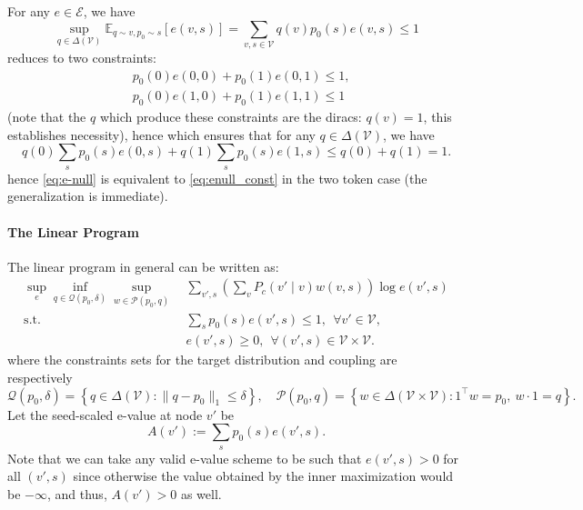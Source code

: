 \documentclass[12pt]{article}
\theoremstyle{plain}
\theoremstyle{definition}
\begin{document}
For any $e \in \mathcal{E}$, we have 
\[ \sup_{q \in \Delta(\mathcal{V})} \mathbb{E}_{q \sim v, p_0 \sim s} [e(v,s)] = \sum_{v,s \in \mathcal{V}}q(v)p_0(s)e(v,s) \le 1\]
reduces to two constraints:
\begin{align}\label{eq:enull_const}
    &p_0(0)e(0,0) + p_0(1)e(0,1) \le 1, \\
    &p_0(0)e(1,0) + p_0(1)e(1,1) \le 1 \nonumber 
\end{align}
(note that the $q$ which produce these constraints are the diracs: $q(v) = 1$, this establishes necessity), hence 
which ensures that for any $q \in \Delta(\mathcal{V})$, we have 
\[ q(0)\sum_{s}p_0(s)e(0,s) + q(1)\sum_{s}p_0(s)e(1,s) \le q(0) + q(1) =1.\]
hence \eqref{eq:e-null} is equivalent to \eqref{eq:enull_const} in the two token case (the generalization is immediate).


\paragraph{The Linear Program}
The linear program in general can be written as:
\begin{align}\label{eq:lp}
    \sup_{e}\inf_{q \in \mathcal{Q}(p_0,\delta)}\sup_{w \in \mathcal{P}(p_0,q)} &~\sum_{v',s}\left(\sum_{v}P_c(v'\mid v)w(v,s)\right)\log e(v',s)\\
    \text{s.t.} &~ \sum_{s} p_0(s)e(v',s) \le 1, ~~\forall v' \in \mathcal{V}, \nonumber  \\
    &~e(v',s) \ge 0, ~~\forall (v',s) \in \mathcal{V}\times \mathcal{V}. \nonumber 
\end{align}
where the constraints sets for the target distribution and coupling are respectively
\[\mathcal{Q}(p_0,\delta) = \left\{q\in \Delta ( \mathcal{V}) : \lVert q - p_0\rVert_1 \le \delta\right\}, \quad \mathcal{P}(p_0,q) = \left\{w \in \Delta(\mathcal{V} \times \mathcal{V}): 1^\top w = p_0, ~ w\cdot 1 = q\right\}.\]
Let the seed-scaled e-value at node $v'$ be 
\[A(v') := \sum_s p_0(s) e(v',s).\]
Note that we can take any valid e-value scheme to be such that $e(v',s) > 0$ for all $(v',s)$ since otherwise the value obtained by the inner maximization would be $-\infty$, and thus, $A(v') > 0$ as well. 
\end{document}
